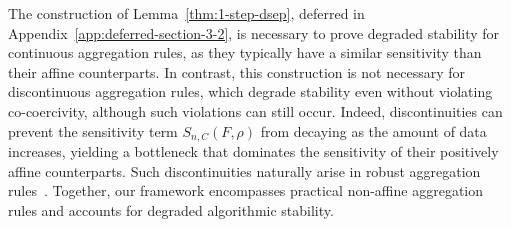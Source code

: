 \documentclass[twoside,11pt]{article}
\newcommand{\F}{\mathcal{F}}
\newcommand{\tb}[1]{\textcolor{orange}{#1}}
\begin{document}
\noindent 
The construction of Lemma~\ref{thm:1-step-dsep}, deferred in Appendix~\ref{app:deferred-section-3-2}, is necessary to prove degraded stability for continuous aggregation rules, as they typically have a similar sensitivity than their affine counterparts.
In contrast, this construction is not necessary for discontinuous aggregation rules, which degrade stability even without violating co-coercivity, although such violations can still occur.
Indeed, discontinuities can prevent the sensitivity term $S_{n, C}(F, \rho)$ from decaying as the amount of data increases, yielding a bottleneck that dominates the sensitivity of their positively affine counterparts.
Such discontinuities naturally arise in robust aggregation rules~\citep{diakonikolas2019robust,blanchard-ml-with-adversaries,pmlr-v206-allouah23a,pmlr-v202-allouah23a,allouah2025towards}.
Together, our framework encompasses practical non-affine aggregation rules and accounts for degraded algorithmic stability.
\end{document}
